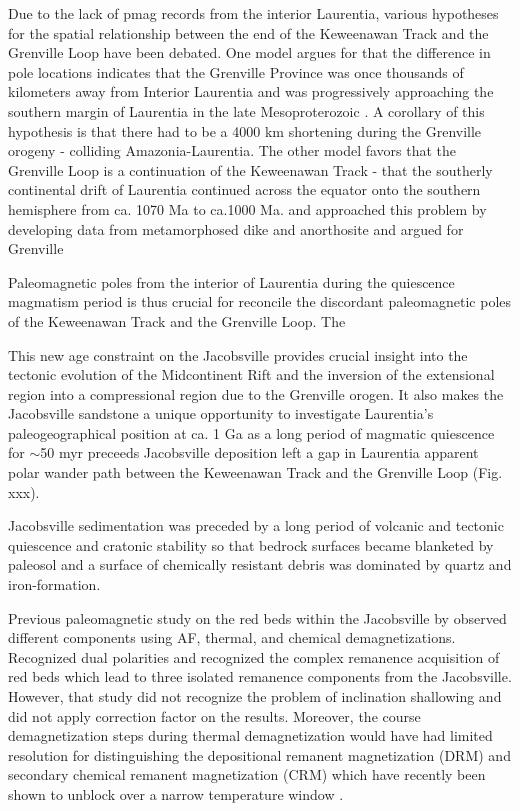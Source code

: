 \documentclass[11pt,letterpaper]{article}
\begin{document}
Due to the lack of pmag records from the interior Laurentia, various hypotheses for the spatial relationship between the end of the Keweenawan Track and the Grenville Loop have been debated. One model argues for that the difference in pole locations indicates that the Grenville Province was once thousands of kilometers away from Interior Laurentia and was progressively approaching the southern margin of Laurentia in the late Mesoproterozoic \citep{Halls2015}. A corollary of this hypothesis is that there had to be a 4000 km shortening during the Grenville orogeny - colliding Amazonia-Laurentia. The other model favors that the Grenville Loop is a continuation of the Keweenawan Track - that the southerly continental drift of Laurentia continued across the equator onto the southern hemisphere from ca. 1070 Ma to ca.1000 Ma. and  approached this problem by developing data from metamorphosed dike and anorthosite and argued for Grenville  

Paleomagnetic poles from the interior of Laurentia during the quiescence magmatism period is thus crucial for reconcile the discordant paleomagnetic poles of the Keweenawan Track and the Grenville Loop. The

This new age constraint on the Jacobsville provides crucial insight into the tectonic evolution of the Midcontinent Rift and the inversion of the extensional region into a compressional region due to the Grenville orogen. It also makes the Jacobsville sandstone a unique opportunity to investigate Laurentia's paleogeographical position at ca. 1 Ga as a long period of magmatic quiescence for $\sim$50 myr preceeds Jacobsville deposition left a gap in Laurentia apparent polar wander path between the Keweenawan Track and the Grenville Loop (Fig. xxx). 

Jacobsville sedimentation was preceded by a long period of volcanic and tectonic quiescence and cratonic stability so that bedrock surfaces became blanketed by paleosol and a surface of chemically resistant debris was dominated by quartz and iron-formation. 

Previous paleomagnetic study on the red beds within the Jacobsville by \cite{Roy1978a} observed different components using AF, thermal, and chemical demagnetizations. Recognized dual polarities and recognized the complex remanence acquisition of red beds which lead to three isolated remanence components from the Jacobsville. However, that study did not recognize the problem of inclination shallowing and did not apply correction factor on the results. Moreover, the course demagnetization steps during thermal demagnetization would have had limited resolution for distinguishing the depositional remanent magnetization (DRM) and secondary chemical remanent magnetization (CRM) which have recently been shown to unblock over a narrow temperature window \cite{Swanson-Hysell2019b}. 
\end{document}
